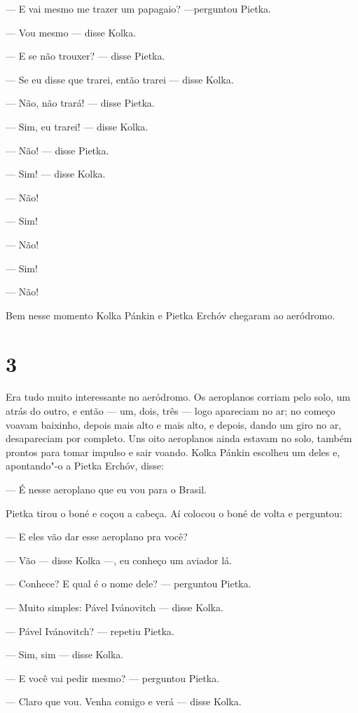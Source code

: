 --- E vai mesmo me trazer um papagaio? ---perguntou Pietka.

--- Vou mesmo --- disse Kolka.

--- E se não trouxer? --- disse Pietka.

--- Se eu disse que trarei, então trarei --- disse Kolka.

--- Não, não trará! --- disse Pietka.

--- Sim, eu trarei! --- disse Kolka.

--- Não! --- disse Pietka.

--- Sim! --- disse Kolka.

--- Não!

--- Sim!

--- Não!

--- Sim!

--- Não!

Bem nesse momento Kolka Pánkin e Pietka Erchóv chega­ram ao aeródromo.

\section{3}

Era tudo muito interessante no aeródromo. Os aeroplanos corriam pelo
solo, um atrás do outro, e então --- um, dois, três --- logo apareciam
no ar; no começo voavam baixinho, depois mais alto e mais alto, e
depois, dando um giro no ar, desapareciam por completo. Uns oito
aeroplanos ainda esta­vam no solo, também prontos para tomar impulso e
sair voan­do. Kolka Pánkin escolheu um deles e, apontando"-o a Pietka
Erchóv, disse:

--- É nesse aeroplano que eu vou para o Brasil.

Pietka tirou o boné e coçou a cabeça. Aí colocou o boné de volta e
perguntou:

--- E eles vão dar esse aeroplano pra você?

--- Vão --- disse Kolka ---, eu conheço um aviador lá.

--- Conhece? E qual é o nome dele? --- perguntou Pietka.

--- Muito simples: Pável Ivánovitch --- disse Kolka.

--- Pável Ivánovitch? --- repetiu Pietka.

--- Sim, sim --- disse Kolka.

--- E você vai pedir mesmo? --- perguntou Pietka.

--- Claro que vou. Venha comigo e verá --- disse Kolka.

